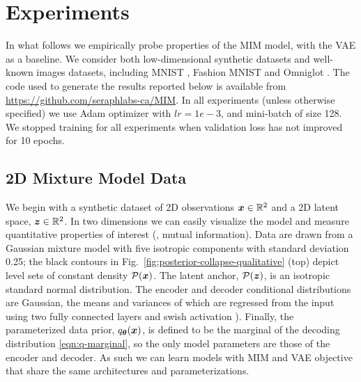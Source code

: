 \section{Experiments} \label{sec:experiments}

In what follows we empirically probe properties of the MIM model,
with the VAE as a baseline.  We consider both low-dimensional synthetic 
datasets and well-known images datasets, including MNIST \cite{LeCun1998}, 
Fashion MNIST \cite{DBLP:journals/corr/abs-1708-07747} and Omniglot \cite{Lake2015}. 
The code used to generate the results reported below is available 
from \href{https://github.com/seraphlabs-ca/MIM}{https://github.com/seraphlabs-ca/MIM}.
In all experiments (unless otherwise specified) we use Adam optimizer \cite{2014arXiv1412.6980K} with $lr = 1e-3$, and
mini-batch of size 128. We stopped training for all experiments when validation loss
has not improved for 10 epochs.

\subsection{2D Mixture Model Data} 
\label{sec:posterior-collapse-mim-vae}


We begin with a synthetic dataset of 2D observations ${\boldsymbol{x}} \in \mathbb{R}^2$
and a 2D latent space, ${\boldsymbol z} \in \mathbb{R}^2$. In two dimensions we can easily 
visualize the model and measure quantitative properties of interest (\eg, mutual information).
Data are drawn from a Gaussian mixture model with five isotropic components
with standard deviation 0.25; the black contours in Fig.\ \ref{fig:posterior-collapse-qualitative} (top) depict level sets of constant density $\mathcal{P}({\boldsymbol{x}})$. 
The latent anchor, $\mathcal{P}({\boldsymbol z})$, is an isotropic standard normal distribution.
The encoder and decoder conditional distributions are Gaussian, the means
and variances of which are regressed from the input using two fully 
connected layers and swish activation \cite{Ramachandran2017}).
Finally, the parameterized data prior, $q_{{\boldsymbol \theta}}({\boldsymbol{x}})$, is defined to be the 
marginal of the decoding distribution \eqref{eqn:q-marginal}, so
the only model parameters are those of the encoder and decoder.
As such we can learn models with MIM and VAE objective that share
the same architectures and parameterizations.

